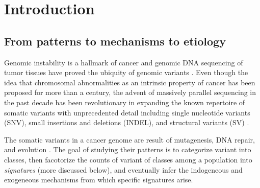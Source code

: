 \documentclass[phd,tocprelim]{cornell}
\begin{document}
\contentspage
\tablelistpage
\figurelistpage


\normalspacing \setcounter{page}{1} 
\pagestyle{cornell} \addtolength{\parskip}{0.5\baselineskip}


\chapter{Introduction}

\section{From patterns to mechanisms to etiology} \label{sec:philo}
Genomic instability is a hallmark of cancer \cite{Hanahan2011-ni} and genomic DNA sequencing of tumor tissues have proved the ubiquity of genomic variants \cite{pcawg_marker2020-yi}. Even though the idea that chromosomal abnormalities as an intrinsic property of cancer has been proposed \cite{Boveri2008-rl} for more than a century, the advent of massively parallel sequencing in the past decade has been revolutionary in expanding the known repertoire of somatic variants with unprecedented detail including single nucleotide variants (SNV), small insertions and deletions (INDEL), and structural variants (SV) \cite{Meyerson2010-xc}.

The somatic variants in a cancer genome are result of mutagenesis, DNA repair, and evolution \cite{Stratton2009-ty}. The goal of studying their patterns is to categorize variant into classes, then facotorize the counts of variant of classes among a population into \textit{signatures} (more discussed below), and eventually infer the indogeneous and exogeneous mechanisms from which specific signatures arise. 
\end{document}
